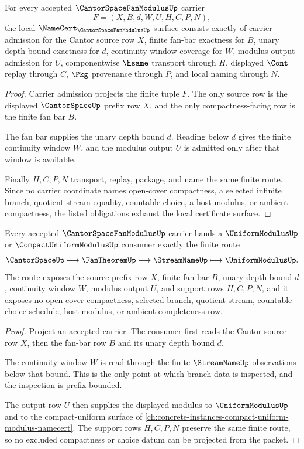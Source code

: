 \begin{theorem}
\label{thm:cantor-space-fan-modulus-namecert-obligations}
For every accepted $\CantorSpaceFanModulusUp$ carrier
$$
F=(X,B,d,W,U,H,C,P,N),
$$
the local $\NameCert_{\CantorSpaceFanModulusUp}$ surface consists exactly of carrier admission for the Cantor source row $X$, finite fan-bar exactness for $B$, unary depth-bound exactness for $d$, continuity-window coverage for $W$, modulus-output admission for $U$, componentwise $\hsame$ transport through $H$, displayed $\Cont$ replay through $C$, $\Pkg$ provenance through $P$, and local naming through $N$.
\end{theorem}
\begin{proof}
Carrier admission projects the finite tuple $F$. The only source row is the displayed $\CantorSpaceUp$ prefix row $X$, and the only compactness-facing row is the finite fan bar $B$.

The fan bar supplies the unary depth bound $d$. Reading below $d$ gives the finite continuity window $W$, and the modulus output $U$ is admitted only after that window is available.

Finally $H,C,P,N$ transport, replay, package, and name the same finite route. Since no carrier coordinate names open-cover compactness, a selected infinite branch, quotient stream equality, countable choice, a host modulus, or ambient compactness, the listed obligations exhaust the local certificate surface.
\end{proof}

\begin{theorem}
\label{thm:cantor-space-fan-modulus-continuity-handoff}
Every accepted $\CantorSpaceFanModulusUp$ carrier hands a $\UniformModulusUp$ or $\CompactUniformModulusUp$ consumer exactly the finite route
$$
\CantorSpaceUp \longmapsto \FanTheoremUp \longmapsto \StreamNameUp \longmapsto \UniformModulusUp .
$$
The route exposes the source prefix row $X$, finite fan bar $B$, unary depth bound $d$, continuity window $W$, modulus output $U$, and support rows $H,C,P,N$, and it exposes no open-cover compactness, selected branch, quotient stream, countable-choice schedule, host modulus, or ambient completeness row.
\end{theorem}
\begin{proof}
Project an accepted carrier. The consumer first reads the Cantor source row $X$, then the fan-bar row $B$ and its unary depth bound $d$.

The continuity window $W$ is read through the finite $\StreamNameUp$ observations below that bound. This is the only point at which branch data is inspected, and the inspection is prefix-bounded.

The output row $U$ then supplies the displayed modulus to $\UniformModulusUp$ and to the compact-uniform surface of \autoref{ch:concrete-instances-compact-uniform-modulus-namecert}. The support rows $H,C,P,N$ preserve the same finite route, so no excluded compactness or choice datum can be projected from the packet.
\end{proof}

